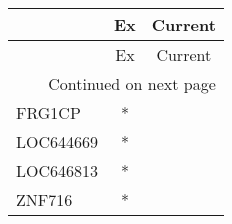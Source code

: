 \begin{longtable}{lcc}
\toprule
{} & Ex & Current \\
\midrule
\endfirsthead

\toprule
{} & Ex & Current \\
\midrule
\endhead
\midrule
\multicolumn{3}{r}{{Continued on next page}} \\
\midrule
\endfoot

\bottomrule
\endlastfoot
FRG1CP    &  * &         \\
LOC644669 &  * &         \\
LOC646813 &  * &         \\
ZNF716    &  * &         \\
\end{longtable}
